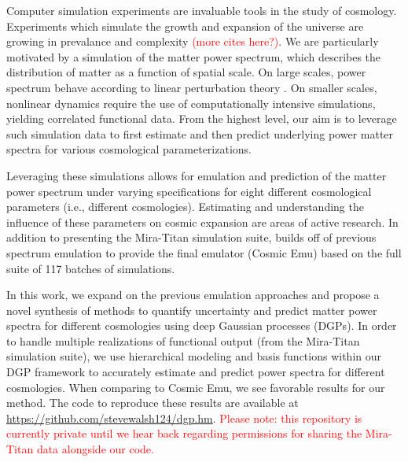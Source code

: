 \documentclass[11pt]{article}
\begin{document}
Computer simulation experiments are invaluable tools in the study of cosmology.
Experiments which simulate the growth and expansion of the universe are growing
in prevalance and complexity \citep[e.g.,][]{lawrence2010coyote,moran2023mira}
\textcolor{red}{(more cites here?)}.  
We are particularly motivated by a simulation
of the matter power spectrum, which describes the distribution of matter as a 
function of spatial scale. 
On large scales, power spectrum behave according to linear perturbation 
theory \citep{pietroni2008flowing, lesgourgues2009non}.  On smaller scales, nonlinear 
dynamics require the use of computationally intensive simulations, yielding
correlated functional data.
From the highest level, our aim is to leverage such simulation data to 
first estimate and then predict underlying power matter spectra for various 
cosmological parameterizations.



Leveraging these simulations allows for emulation and prediction of the matter power spectrum under varying specifications for eight different cosmological parameters (i.e., different cosmologies). Estimating and understanding the influence of these parameters on cosmic expansion are areas of active research. In addition to presenting the Mira-Titan simulation suite, \cite{moran2023mira} builds off of previous spectrum emulation \citep{lawrence2017mira} to provide the final emulator (Cosmic Emu) based on the full suite of 117 batches of simulations. 

In this work, we expand on the previous emulation approaches and propose a novel synthesis of methods to quantify uncertainty and predict matter power spectra for different cosmologies using deep Gaussian processes (DGPs). In order to handle multiple realizations of functional output (from the Mira-Titan simulation suite), we use hierarchical modeling and basis functions within our DGP framework to accurately estimate and predict power spectra for different cosmologies. When comparing to Cosmic Emu, we see favorable results for our method. The code to reproduce these results are available at \url{https://github.com/stevewalsh124/dgp.hm}. \textcolor{red}{Please note: this repository is currently private until we hear back regarding permissions for sharing the Mira-Titan data alongside our code.}
\end{document}

